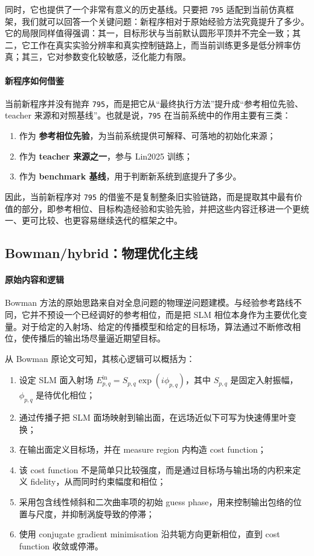 \documentclass[12pt,a4paper]{ctexart}
\begin{document}
同时，它也提供了一个非常有意义的历史基线。只要把 \texttt{795} 适配到当前仿真框架，我们就可以回答一个关键问题：新程序相对于原始经验方法究竟提升了多少。它的局限同样值得强调：其一，目标形状与当前默认圆形平顶并不完全一致；其二，它工作在真实实验分辨率和真实控制链路上，而当前训练更多是低分辨率仿真；其三，它对参数变化较敏感，泛化能力有限。

\paragraph{新程序如何借鉴}
当前新程序并没有抛弃 \texttt{795}，而是把它从“最终执行方法”提升成“参考相位先验、teacher 来源和对照基线”。也就是说，\texttt{795} 在当前系统中的作用主要有三类：
\begin{enumerate}[label=\arabic*.]
    \item 作为 \textbf{参考相位先验}，为当前系统提供可解释、可落地的初始化来源；
    \item 作为 \textbf{teacher 来源之一}，参与 Lin2025 训练；
    \item 作为 \textbf{benchmark 基线}，用于判断新系统到底提升了多少。
\end{enumerate}

因此，当前新程序对 \texttt{795} 的借鉴不是复制整条旧实验链路，而是提取其中最有价值的部分，即参考相位、目标构造经验和实验先验，并把这些内容迁移进一个更统一、更可比较、也更容易继续迭代的框架之中。

\subsection{Bowman/hybrid：物理优化主线}
\paragraph{原始内容和逻辑}
Bowman 方法的原始思路来自对全息问题的物理逆问题建模。与经验参考路线不同，它并不预设一个已经调好的参考相位，而是把 SLM 相位本身作为主要优化变量。对于给定的入射场、给定的传播模型和给定的目标场，算法通过不断修改相位，使传播后的输出场尽量逼近期望目标。

从 Bowman 原论文可知，其核心逻辑可以概括为：
\begin{enumerate}[label=\arabic*.]
    \item 设定 SLM 面入射场 $E^{\mathrm{in}}_{p,q}=S_{p,q}\exp(i\phi_{p,q})$，其中 $S_{p,q}$ 是固定入射振幅，$\phi_{p,q}$ 是待优化相位；
    \item 通过传播子把 SLM 面场映射到输出面，在远场近似下可写为快速傅里叶变换；
    \item 在输出面定义目标场，并在 measure region 内构造 cost function；
    \item 该 cost function 不是简单只比较强度，而是通过目标场与输出场的内积来定义 fidelity，从而同时约束幅度和相位；
    \item 采用包含线性倾斜和二次曲率项的初始 guess phase，用来控制输出包络的位置与尺度，并抑制涡旋导致的停滞；
    \item 使用 conjugate gradient minimisation 沿共轭方向更新相位，直到 cost function 收敛或停滞。
\end{enumerate}
\end{document}
